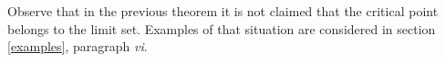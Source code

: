 \documentclass[a4paper,11pt]{article}
\newtheorem{theorem}{Theorem}
\newtheorem{lemma}{Lemma}
\theoremstyle{definition}
\def\DD{{\mathbb D}}
\def\de{\delta}
\begin{document}
Observe that in the previous theorem it is not claimed that the critical point belongs to the limit set. Examples of that situation are considered in  section \ref{examples}, paragraph {\em vi}. %





    



 





 
 
 
\end{document}
